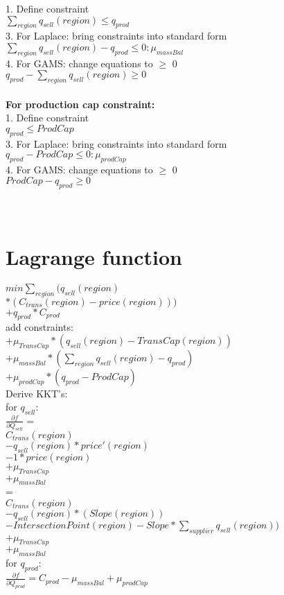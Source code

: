 \documentclass{article}
\begin{document}
1. Define constraint\\
\quad$\sum_{region} q_{sell}(region) \leq q_{prod} $\\
3. For Laplace: bring constraints into standard form\\
\quad$\sum_{region} q_{sell}(region) - q_{prod}  \leq 0 : \mu_{massBal}$\\
4. For GAMS: change equations to $\geq$ 0\\
\quad$q_{prod}  - \sum_{region} q_{sell}(region) \geq 0\: $\\


\hfill\\
\textbf{For	production cap constraint: }\\
1. Define constraint\\
\quad$q_{prod} \leq ProdCap$\\
3. For Laplace: bring constraints into standard form\\
\quad$q_{prod} - ProdCap\leq 0  : \mu_{prodCap}$\\
4. For GAMS: change equations to $\geq$ 0\\
\quad$ProdCap - q_{prod} \geq 0$\\


\hfill\\ 
\hfill\\
\section*{Lagrange function}
\quad$min \sum_{region}\Big( q_{sell}(region) $\\
\quad$*(C_{trans}(region) - price(region))\Big) $\\
\quad$+ q_{prod}*C_{prod}$\\
add constraints:\\
\quad$+\mu_{TransCap} * (q_{sell}(region) - TransCap(region))$\\
\quad$+\mu_{massBal} * (\sum_{region} q_{sell}(region) - q_{prod})$\\
\quad$+\mu_{prodCap}* (q_{prod} - ProdCap)$\\

Derive KKT's:\\ 	
for $q_{sell}:$\\
\quad$\frac{\partial f}{\partial Q_{sell}} = $\\
\quad$C_{trans}(region)$\\ 
\quad$-q_{sell}(region)*price'(region)$\\
\quad$-1*price(region)$\\
\quad$+\mu_{TransCap}$\\
\quad$+\mu_{massBal}$\\
\quad =\\
\quad$C_{trans}(region)$\\
\quad$-q_{sell}(region)*(Slope(region))$\\
\quad$- IntersectionPoint(region) - Slope * \sum_{supplier} q_{sell}(region))$\\
\quad$+\mu_{TransCap}$\\
\quad$+\mu_{massBal}$\\
for $q_{prod}:$\\
\quad$\frac{\partial f}{\partial Q_{prod}} = C_{prod} - \mu_{massBal} + \mu_{prodCap}$\\
\end{document}
